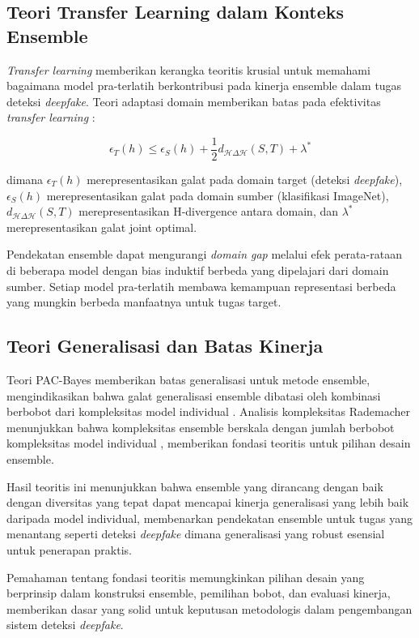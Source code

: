 \subsection{Teori Transfer Learning dalam Konteks Ensemble}

\textit{Transfer learning} memberikan kerangka teoritis krusial untuk memahami bagaimana model pra-terlatih berkontribusi pada kinerja ensemble dalam tugas deteksi \textit{deepfake}. Teori adaptasi domain memberikan batas pada efektivitas \textit{transfer learning} \cite{ben2010theory}:

\begin{equation}
\epsilon_T(h) \leq \epsilon_S(h) + \frac{1}{2}d_{\mathcal{H}\Delta\mathcal{H}}(S,T) + \lambda^*
\label{eq:transfer_learning_bound}
\end{equation}

dimana $\epsilon_T(h)$ merepresentasikan galat pada domain target (deteksi \textit{deepfake}), $\epsilon_S(h)$ merepresentasikan galat pada domain sumber (klasifikasi ImageNet), $d_{\mathcal{H}\Delta\mathcal{H}}(S,T)$ merepresentasikan H-divergence antara domain, dan $\lambda^*$ merepresentasikan galat joint optimal.

Pendekatan ensemble dapat mengurangi \textit{domain gap} melalui efek perata-rataan di beberapa model dengan bias induktif berbeda yang dipelajari dari domain sumber. Setiap model pra-terlatih membawa kemampuan representasi berbeda yang mungkin berbeda manfaatnya untuk tugas target.

\subsection{Teori Generalisasi dan Batas Kinerja}

Teori PAC-Bayes memberikan batas generalisasi untuk metode ensemble, mengindikasikan bahwa galat generalisasi ensemble dibatasi oleh kombinasi berbobot dari kompleksitas model individual \cite{mcallester1999pac}. Analisis kompleksitas Rademacher menunjukkan bahwa kompleksitas ensemble berskala dengan jumlah berbobot kompleksitas model individual \cite{mohri2012foundations}, memberikan fondasi teoritis untuk pilihan desain ensemble.

Hasil teoritis ini menunjukkan bahwa ensemble yang dirancang dengan baik dengan diversitas yang tepat dapat mencapai kinerja generalisasi yang lebih baik daripada model individual, membenarkan pendekatan ensemble untuk tugas yang menantang seperti deteksi \textit{deepfake} dimana generalisasi yang robust esensial untuk penerapan praktis.

Pemahaman tentang fondasi teoritis memungkinkan pilihan desain yang berprinsip dalam konstruksi ensemble, pemilihan bobot, dan evaluasi kinerja, memberikan dasar yang solid untuk keputusan metodologis dalam pengembangan sistem deteksi \textit{deepfake}.